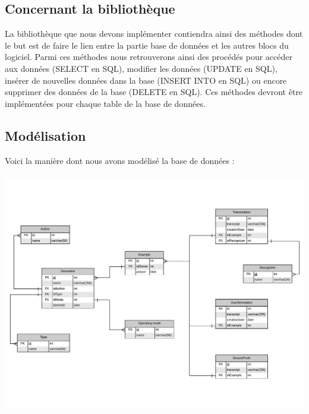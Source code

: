 \subsection{Concernant la bibliothèque}

La bibliothèque que nous devons implémenter contiendra ainsi des méthodes dont le but est de faire le lien entre la partie base de données et les autres blocs du logiciel. Parmi ces méthodes nous retrouverons ainsi des procédés pour accéder aux données (SELECT en SQL), modifier les données (UPDATE en SQL), insérer de nouvelles données dans la base (INSERT INTO en SQL) ou encore supprimer des données de la base (DELETE en SQL). Ces méthodes devront être implémentées pour chaque table de la base de données.

\subsection{Modélisation}

Voici la manière dont nous avons modélisé la base de données :

\paragraph{}

\begin{mdframed}[frametitle={Figure 6 : Modèle entité association de la Base de données}, innerbottommargin=10]
\begin{center}
\includegraphics[width=\linewidth]{Modele_entite_association.pdf}
\end{center}
\end{mdframed}

